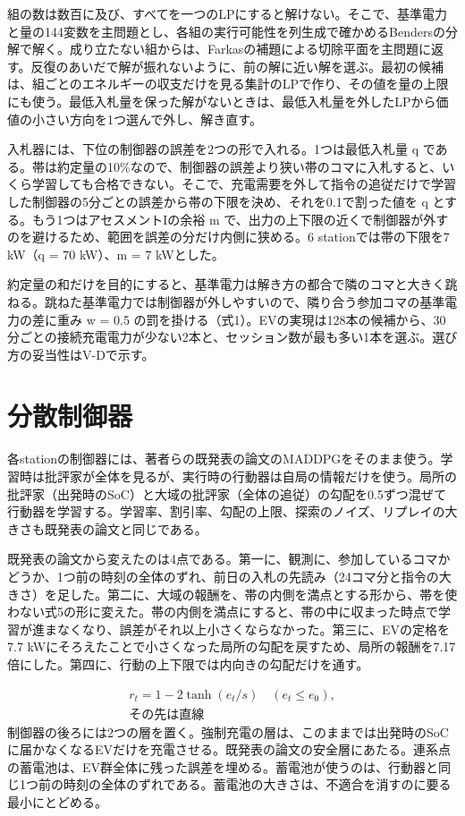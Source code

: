 \documentclass[lettersize,journal]{IEEEtran}
\begin{document}
組の数は数百に及び、すべてを一つのLPにすると解けない。そこで、基準電力と量の144変数を主問題とし、各組の実行可能性を列生成で確かめるBendersの分解で解く。成り立たない組からは、Farkasの補題による切除平面を主問題に返す。反復のあいだで解が振れないように、前の解に近い解を選ぶ。最初の候補は、組ごとのエネルギーの収支だけを見る集計のLPで作り、その値を量の上限にも使う。最低入札量を保った解がないときは、最低入札量を外したLPから価値の小さい方向を1つ選んで外し、解き直す。

入札器には、下位の制御器の誤差を2つの形で入れる。1つは最低入札量 q である。帯は約定量の10\%なので、制御器の誤差より狭い帯のコマに入札すると、いくら学習しても合格できない。そこで、充電需要を外して指令の追従だけで学習した制御器の5分ごとの誤差から帯の下限を決め、それを0.1で割った値を q とする。もう1つはアセスメントIの余裕 m で、出力の上下限の近くで制御器が外すのを避けるため、範囲を誤差の分だけ内側に狭める。6 stationでは帯の下限を7 kW（q = 70 kW）、m = 7 kWとした。

約定量の和だけを目的にすると、基準電力は解き方の都合で隣のコマと大きく跳ねる。跳ねた基準電力では制御器が外しやすいので、隣り合う参加コマの基準電力の差に重み w = 0.5 の罰を掛ける（式1）。EVの実現は128本の候補から、30分ごとの接続充電電力が少ない2本と、セッション数が最も多い1本を選ぶ。選び方の妥当性はV-Dで示す。

\section{分散制御器}
各stationの制御器には、著者らの既発表の論文\cite{ref1}のMADDPG\cite{ref21}をそのまま使う。学習時は批評家が全体を見るが、実行時の行動器は自局の情報だけを使う。局所の批評家（出発時のSoC）と大域の批評家（全体の追従）の勾配を0.5ずつ混ぜて行動器を学習する。学習率、割引率、勾配の上限、探索のノイズ、リプレイの大きさも既発表の論文と同じである。

既発表の論文から変えたのは4点である。第一に、観測に、参加しているコマかどうか、1つ前の時刻の全体のずれ、前日の入札の先読み（24コマ分と指令の大きさ）を足した。第二に、大域の報酬を、帯の内側を満点とする形から、帯を使わない式5の形に変えた。帯の内側を満点にすると、帯の中に収まった時点で学習が進まなくなり、誤差がそれ以上小さくならなかった。第三に、EVの定格を7.7 kWにそろえたことで小さくなった局所の勾配を戻すため、局所の報酬を7.17倍にした。第四に、行動の上下限では内向きの勾配だけを通す。

\begin{equation}\begin{gathered}r_t=1-2\tanh(e_t/s)\quad(e_t\le e_0),\\\text{その先は直線}\end{gathered}\label{eq:5}\end{equation}
制御器の後ろには2つの層を置く。強制充電の層は、このままでは出発時のSoCに届かなくなるEVだけを充電させる。既発表の論文の安全層にあたる。連系点の蓄電池は、EV群全体に残った誤差を埋める。蓄電池が使うのは、行動器と同じ1つ前の時刻の全体のずれである。蓄電池の大きさは、不適合を消すのに要る最小にとどめる。
\end{document}

